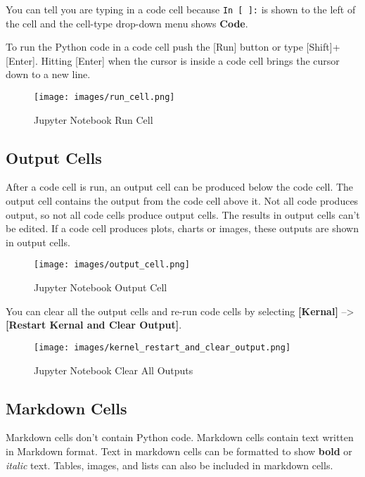 \documentclass{book}
\makeatletter
\def\maxwidth{\ifdim\Gin@nat@width>\linewidth\linewidth
\else\Gin@nat@width\fi}
\let\Oldincludegraphics\includegraphics
\renewcommand{\includegraphics}[1]{\Oldincludegraphics[width=.8\maxwidth]{#1}}
\newcommand{\passthrough}[1]{#1}
\makeatother
\begin{document}
You can tell you are typing in a code cell because
\passthrough{\lstinline!In [ ]:!} is shown to the left of the cell and
the cell-type drop-down menu shows \textbf{Code}.

To run the Python code in a code cell push the {[}Run{]} button or type
{[}Shift{]}+{[}Enter{]}. Hitting {[}Enter{]} when the cursor is inside a
code cell brings the cursor down to a new line.

\begin{figure}
\centering
\texttt{[image: images/run\_cell.png]}
\caption{Jupyter Notebook Run Cell}
\end{figure}
    




    
        \hypertarget{output-cells}{%
\subsection{Output Cells}\label{output-cells}}

After a code cell is run, an output cell can be produced below the code
cell. The output cell contains the output from the code cell above it.
Not all code produces output, so not all code cells produce output
cells. The results in output cells can't be edited. If a code cell
produces plots, charts or images, these outputs are shown in output
cells.

\begin{figure}
\centering
\texttt{[image: images/output\_cell.png]}
\caption{Jupyter Notebook Output Cell}
\end{figure}

You can clear all the output cells and re-run code cells by selecting
\textbf{{[}Kernal{]}} --\textgreater{} \textbf{{[}Restart Kernal and
Clear Output{]}}.

\begin{figure}
\centering
\texttt{[image: images/kernel\_restart\_and\_clear\_output.png]}
\caption{Jupyter Notebook Clear All Outputs}
\end{figure}
    




    
        \hypertarget{markdown-cells}{%
\subsection{Markdown Cells}\label{markdown-cells}}

Markdown cells don't contain Python code. Markdown cells contain text
written in Markdown format. Text in markdown cells can be formatted to
show \textbf{bold} or \emph{italic} text. Tables, images, and lists can
also be included in markdown cells.
\end{document}
